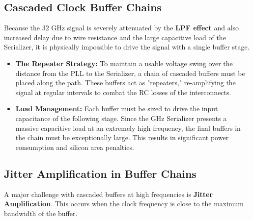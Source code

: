 \subsection{Cascaded Clock Buffer Chains}
\label{subsec:cascaded-buffers}

Because the 32 GHz signal is severely attenuated by the\textbf{ LPF effect} and also increased delay due to wire resistance and the large capacitive load of the Serializer, it is physically impossible to drive the signal with a single buffer stage.

\begin{itemize}
    \item \textbf{The Repeater Strategy:} To maintain a usable voltage swing over the distance from the PLL to the Serializer, a chain of cascaded buffers must be placed along the path. These buffers act as "repeaters," re-amplifying the signal at regular intervals to combat the RC losses of the interconnects.
    
    \item \textbf{Load Management:} Each buffer must be sized to drive the input capacitance of the following stage. Since the GHz Serializer presents a massive capacitive load at an extremely high frequency, the final buffers in the chain must be exceptionally large. This results in significant power consumption and silicon area penalties.
\end{itemize}

\subsection{Jitter Amplification in Buffer Chains}
\label{subsec:jitter-amplification}

A major challenge with cascaded buffers at high frequencies is \textbf{Jitter Amplification}. This occurs when the clock frequency is close to the maximum bandwidth of the buffer.

